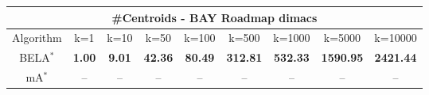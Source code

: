 \begin{tabular}{c|cccccccc}\toprule
\multicolumn{9}{c}{#Centroids - BAY Roadmap dimacs}\\ \midrule
Algorithm & k=1 & k=10 & k=50 & k=100 & k=500 & k=1000 & k=5000 & k=10000 \\ \midrule
BELA$^*$ & \textbf{1.00} & \textbf{9.01} & \textbf{42.36} & \textbf{80.49} & \textbf{312.81} & \textbf{532.33} & \textbf{1590.95} & \textbf{2421.44} \\
mA$^*$ & -- & -- & -- & -- & -- & -- & -- & -- \\ \bottomrule 
\end{tabular}
